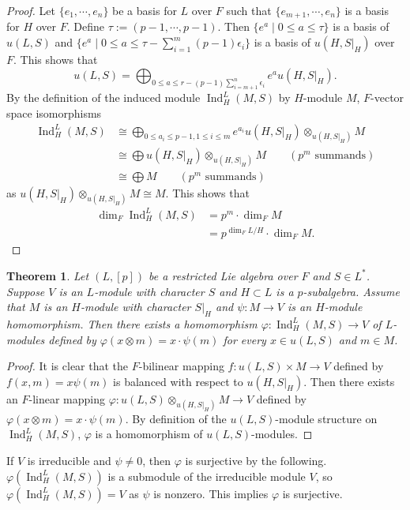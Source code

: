 \documentclass[12pt,MSc]{muthesis_2023}
\theoremstyle{plain}%
\newtheorem{Theorem}[FactCounter]{Theorem} %
\theoremstyle{definition}
\theoremstyle{remark}
\DeclareMathOperator{\Ind}{Ind}
\begin{document}
\begin{proof}
Let $\{e_1, \cdots, e_n\}$ be a basis for $L$ over $F$ such that $\{e_{m+1}, \cdots, e_n\}$ is a basis for $H$ over $F$. Define $\tau := (p-1, \cdots, p-1)$. Then $\{e^a \mid 0\leq a \leq \tau\}$ is a basis of $u(L,S)$ and $\{e^a\mid 0 \leq a \leq \tau-\sum_{i=1}^m (p-1)\epsilon_i\}$ is a basis of $u(H, S|_H)$ over $F$. This shows that
$$u(L,S)=\bigoplus_{0\leq a\leq r-(p-1)\sum_{i=m+1}^n \epsilon_i}e^au(H, S|_H).$$
By the definition of the induced module $\Ind_H^L(M, S)$ by $H$-module $M$, $F$-vector space isomorphisms
\begin{align*}
\Ind_H^L(M, S)&\cong\bigoplus_{0\leq a_i\leq p-1, 1\leq i \leq m}e^{a_i}u(H, S|_H)\otimes_{u(H, S|_H)}M\\
 &\cong\bigoplus u(H, S|_H)\otimes_{u(H, S|_H)}M \quad\quad(p^m \text{ summands})\\
 &\cong\bigoplus M \quad\quad(p^m \text{ summands})
\end{align*}
as $u(H, S|_H)\otimes_{u(H, S|_H)}M\cong M$. This shows that
\begin{align*}
\dim_F\Ind^L_H(M,S)&=p^m\cdot \dim_FM\\
& =p^{\dim_FL/H}\cdot \dim_FM.
\end{align*}
\end{proof}

\begin{Theorem}\label{IndandVhm}
Let $(L, [p])$ be a restricted Lie algebra over $F$ and $S\in L^*$. Suppose $V$ is an $L$-module with character $S$ and $H\subset L$ is a $p$-subalgebra. Assume that $M$ is an $H$-module with character $S|_H$ and $\psi:M\rightarrow V$ is an $H$-module homomorphism. Then there exists a homomorphism $\varphi: \Ind^L_H(M,S)\rightarrow V$ of $L$-modules defined by $\varphi(x\otimes m)=x\cdot\psi(m)$ for every $x\in u(L,S)$ and $m\in M$.
\end{Theorem}

\begin{proof}
It is clear that the $F$-bilinear mapping $f: u(L,S)\times M \rightarrow V$ defined by $f(x,m)=x\psi(m)$ is balanced with respect to $u(H, S|_H)$. Then there exists an $F$-linear mapping $\varphi: u(L,S)\otimes_{u(H, S|_H)}M\rightarrow V$ defined by $\varphi(x\otimes m)=x\cdot\psi(m)$. By definition of the $u(L,S)$-module structure on $\Ind_H^L(M,S)$, $\varphi$ is a homomorphism of $u(L,S)$-modules.
\end{proof}

If $V$ is irreducible and $\psi \neq 0$, then $\varphi$ is surjective by the following. $\varphi(\Ind_H^L(M,S))$ is a submodule of the irreducible module $V$, so $\varphi(\Ind_H^L(M,S))=V$ as $\psi$ is nonzero. This implies $\varphi$ is surjective.
\end{document}
